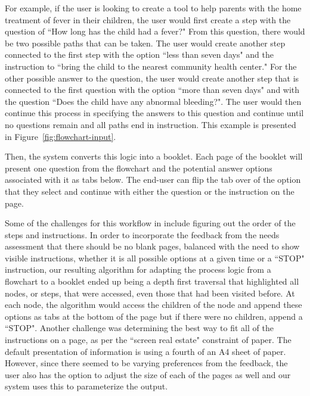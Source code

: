 \documentclass{sig-alternate}
\begin{document}
For example, if the user is looking to create a tool to help parents with the home treatment of fever in their children, the user would first create a step with the question of ``How long has the child had a fever?" From this question, there would be two possible paths that can be taken. The user would create another step connected to the first step with the option ``less than seven days" and the instruction to ``bring the child to the nearest community health center." For the other possible answer to the question, the user would create another step that is connected to the first question with the option ``more than seven days" and with the question ``Does the child have any abnormal bleeding?". The user would then continue this process in specifying the answers to this question and continue until no questions remain and all paths end in instruction. This example is presented in Figure~\ref{fig:flowchart-input}.

Then, the system converts this logic into a booklet. Each page of the booklet will present one question from the flowchart and the potential answer options associated with it as tabs below. The end-user can flip the tab over of the option that they select and continue with either the question or the instruction on the page.

Some of the challenges for this workflow in \nifty include figuring out the order of the steps and instructions. In order to incorporate the feedback from the needs assessment that there should be no blank pages, balanced with the need to show visible instructions, whether it is all possible options at a given time or a ``STOP" instruction, our resulting algorithm for adapting the process logic from a flowchart to a booklet ended up being a depth first traversal that highlighted all nodes, or steps, that were accessed, even those that had been visited before. At each node, the algorithm would access the children of the node and append these options as tabs at the bottom of the page but if there were no children, append a ``STOP". Another challenge was determining the best way to fit all of the instructions on a page, as per the ``screen real estate" constraint of paper. The default presentation of information is using a fourth of an A4 sheet of paper. However, since there seemed to be varying preferences from the feedback, the user also has the option to adjust the size of each of the pages as well and our system uses this to parameterize the output.

\end{document}

